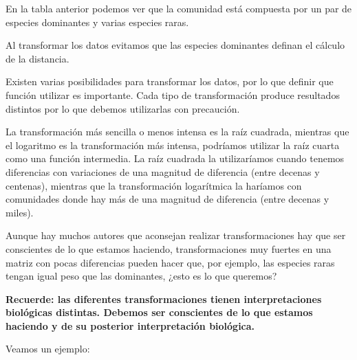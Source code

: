 \documentclass[]{book}
\begin{document}
En la tabla anterior podemos ver que la comunidad está compuesta por un
par de especies dominantes y varias especies raras.

Al transformar los datos evitamos que las especies dominantes definan el
cálculo de la distancia.

Existen varias posibilidades para transformar los datos, por lo que
definir que función utilizar es importante. Cada tipo de transformación
produce resultados distintos por lo que debemos utilizarlas con
precaución.

La transformación más sencilla o menos intensa es la raíz cuadrada,
mientras que el logaritmo es la transformación más intensa, podríamos
utilizar la raíz cuarta como una función intermedia. La raíz cuadrada la
utilizaríamos cuando tenemos diferencias con variaciones de una magnitud
de diferencia (entre decenas y centenas), mientras que la transformación
logarítmica la haríamos con comunidades donde hay más de una magnitud de
diferencia (entre decenas y miles).

Aunque hay muchos autores que aconsejan realizar transformaciones hay
que ser conscientes de lo que estamos haciendo, transformaciones muy
fuertes en una matriz con pocas diferencias pueden hacer que, por
ejemplo, las especies raras tengan igual peso que las dominantes, ¿esto
es lo que queremos?

\textbf{Recuerde: las diferentes transformaciones tienen
interpretaciones biológicas distintas. Debemos ser conscientes de lo que
estamos haciendo y de su posterior interpretación biológica.}

Veamos un ejemplo:
\end{document}
